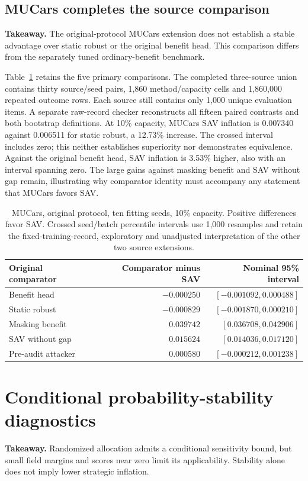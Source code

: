 \documentclass[11pt]{article}
\begin{document}
\subsection{MUCars completes the source comparison}
\noindent\textbf{Takeaway.} The original-protocol MUCars extension does not
establish a stable advantage over static robust or the original benefit head.
This comparison differs from the separately tuned ordinary-benefit benchmark.

Table~\ref{tab:original_mucars} retains the five primary comparisons. The completed three-source union contains thirty source/seed pairs, 1,860
method/capacity cells and 1,860,000 repeated outcome rows. Each source still
contains only 1,000 unique evaluation items. A separate raw-record checker
reconstructs all fifteen paired contrasts and both bootstrap definitions.
At 10\% capacity, MUCars SAV inflation is 0.007340 against 0.006511 for static
robust, a 12.73\% increase. The crossed interval includes zero; this neither
establishes superiority nor demonstrates equivalence. Against the original
benefit head, SAV inflation is 3.53\% higher, also with an interval spanning zero.
The large gains against masking benefit and SAV without gap remain, illustrating
why comparator identity must accompany any statement that MUCars favors SAV.

\begin{table}[htbp]
\centering\small
\begin{tabular}{lrr}
\toprule Original comparator & Comparator minus SAV & Nominal 95\% interval\\
\midrule
Benefit head & $-0.000250$ & $[-0.001092,0.000488]$\\
Static robust & $-0.000829$ & $[-0.001870,0.000210]$\\
Masking benefit & $0.039742$ & $[0.036708,0.042906]$\\
SAV without gap & $0.015624$ & $[0.014036,0.017120]$\\
Pre-audit attacker & $0.000580$ & $[-0.000212,0.001238]$\\
\bottomrule
\end{tabular}
\caption{MUCars, original protocol, ten fitting seeds, 10\% capacity.
Positive differences favor SAV. Crossed seed/batch percentile intervals use
1,000 resamples and retain the fixed-training-record, exploratory and
unadjusted interpretation of the other two source extensions.}\label{tab:original_mucars}
\end{table}

\section{Conditional probability-stability diagnostics}\label{app:stability}
\noindent\textbf{Takeaway.} Randomized allocation admits a conditional
sensitivity bound, but small field margins and scores near zero limit its
applicability. Stability alone does not imply lower strategic inflation.
\end{document}
